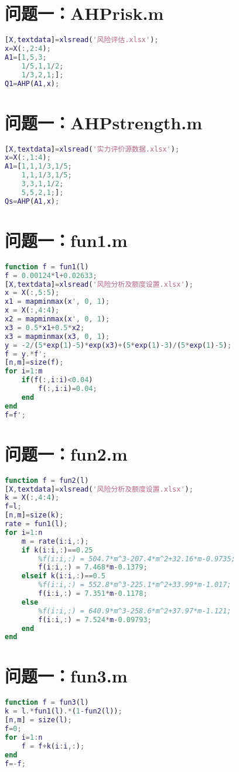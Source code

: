 \documentclass[withoutpreface,bwprint]{cumcmthesis}
\begin{document}
\begin{appendices}
\section{问题一：AHPrisk.m}
\begin{lstlisting}[language=matlab]
    [X,textdata]=xlsread('风险评估.xlsx');
x=X(:,2:4);
A1=[1,5,3;
    1/5,1,1/2;
    1/3,2,1;];
Q1=AHP(A1,x);
\end{lstlisting}

\section{问题一：AHPstrength.m}
\begin{lstlisting}[language=matlab]
[X,textdata]=xlsread('实力评价源数据.xlsx');
x=X(:,1:4);
A1=[1,1,1/3,1/5;
    1,1,1/3,1/5;
    3,3,1,1/2;
    5,5,2,1;];
Qs=AHP(A1,x);
\end{lstlisting}

\section{问题一：fun1.m}
\begin{lstlisting}[language=matlab]
    function f = fun1(l)
f = 0.00124*l+0.02633;
[X,textdata]=xlsread('风险分析及额度设置.xlsx');
x = X(:,5:5);
x1 = mapminmax(x', 0, 1);
x = X(:,4:4);
x2 = mapminmax(x', 0, 1);
x3 = 0.5*x1+0.5*x2;
x3 = mapminmax(x3, 0, 1);
y = -2/(5*exp(1)-5)*exp(x3)+(5*exp(1)-3)/(5*exp(1)-5);
f = y.*f';
[n,m]=size(f);
for i=1:m
    if(f(:,i:i)<0.04)
        f(:,i:i)=0.04;
    end
end
f=f';
\end{lstlisting}

\section{问题一：fun2.m}
\begin{lstlisting}[language=matlab]
    function f = fun2(l)
[X,textdata]=xlsread('风险分析及额度设置.xlsx');
k = X(:,4:4);
f=l;
[n,m]=size(k);
rate = fun1(l);
for i=1:n
    m = rate(i:i,:);
    if k(i:i,:)==0.25
        %f(i:i,:) = 504.7*m^3-207.4*m^2+32.16*m-0.9735;
        f(i:i,:) = 7.468*m-0.1379;
    elseif k(i:i,:)==0.5
        %f(i:i,:) = 552.8*m^3-225.1*m^2+33.99*m-1.017;
        f(i:i,:) = 7.351*m-0.1178;
    else
        %f(i:i,:) = 640.9*m^3-258.6*m^2+37.97*m-1.121;
        f(i:i,:) = 7.524*m-0.09793;
    end
end
\end{lstlisting}

\section{问题一：fun3.m}
\begin{lstlisting}[language=matlab]
function f = fun3(l)
k = l.*fun1(l).*(1-fun2(l));
[n,m] = size(l);
f=0;
for i=1:n
    f = f+k(i:i,:);
end
f=-f;
\end{lstlisting}


\end{appendices}
\end{document}
